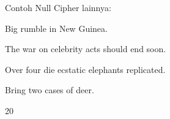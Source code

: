 \documentclass{article}
\begin{document}

Contoh Null Cipher lainnya:

Big rumble in New Guinea.

The war on celebrity acts should end soon. 

Over four die ecstatic elephants replicated.

Bring two cases of deer.

20
\end{document}
